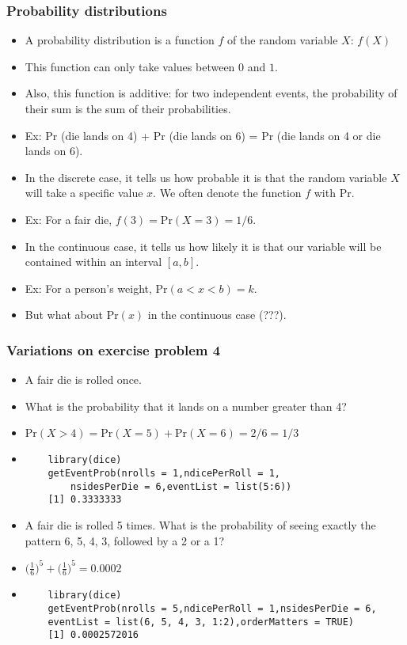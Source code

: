 \documentclass[xcolor=dvipsnames, 9pt]{beamer} %
\begin{document}
\begin{frame}
\frametitle{Probability distributions}
\begin{small}
\begin{itemize}
	\itemsep\setlength{1em}
\item A probability distribution is a function $f$ of the random variable $X$: $f(X)$
\item This function can only take values between $0$ and $1$.
\item Also, this function is additive: for two independent events, the probability of their sum is the sum of their probabilities. 
\item Ex: Pr (die lands on 4) + Pr (die lands on 6) = Pr (die lands on 4  or die lands on 6).
\item In the discrete case, it tells us how probable it is that the random variable $X$ will take a specific value $x$. We often denote the function $f$ with $\textrm{Pr.}$
\item Ex: For a fair die, $f(3) = \textrm{Pr}(X = 3) = 1/6$.
\item In the continuous case, it tells us how likely it is that our variable will be contained within an interval $[a, b]$. 
\item Ex: For a person's weight, $\textrm{Pr}(a < x < b) = k$.
\item But what about $\textrm{Pr}(x)$ in the continuous case (???).
\end{itemize}
\end{small}
\end{frame}

\begin{frame}[fragile]
\frametitle{Variations on exercise problem 4}
\begin{itemize}
\itemsep\setlength{1em}
	\item A fair die is rolled once. 
	\item What is the probability that it lands on a number greater than 4?
	\item[] $\textrm{Pr}(X > 4) = \textrm{Pr}(X = 5) + \textrm{Pr}(X = 6) = 2/6 = 1/3$
	\item[] 
	\begin{verbatim}
	library(dice)
	getEventProb(nrolls = 1,ndicePerRoll = 1,
		nsidesPerDie = 6,eventList = list(5:6))
	[1] 0.3333333
		\end{verbatim}
	\item A fair die is rolled 5 times. What is the probability of seeing exactly the pattern 6, 5, 4, 3, followed by a 2 or a 1? 
	\item $\bigg( \frac{1}{6} \bigg)^5 + \bigg( \frac{1}{6} \bigg)^5 = 0.0002$
	\item[]
	\begin{verbatim}
	library(dice)
	getEventProb(nrolls = 5,ndicePerRoll = 1,nsidesPerDie = 6,
	eventList = list(6, 5, 4, 3, 1:2),orderMatters = TRUE)
	[1] 0.0002572016
	\end{verbatim}
\end{itemize}
\end{frame}
\end{document}
